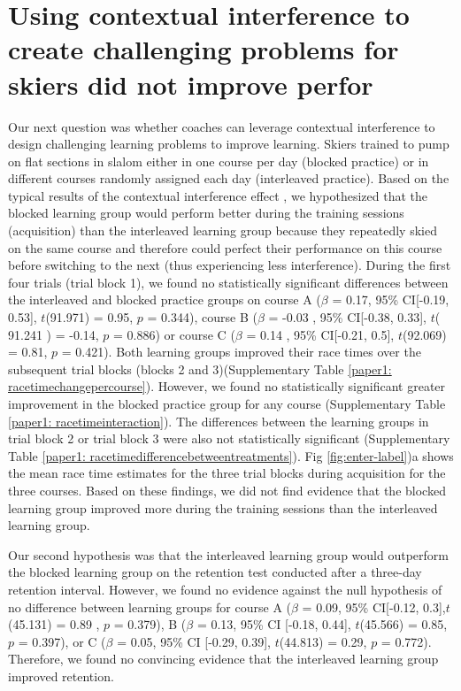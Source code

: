 \section{Using contextual interference to create challenging problems for skiers did not improve perfor}
Our next question was whether coaches can leverage contextual interference to design challenging learning problems to improve learning. Skiers trained to pump on flat sections in slalom either in one course per day (blocked practice) or in different courses randomly assigned each day (interleaved practice). Based on the typical results of the contextual interference effect \cite{simon_metacognition_2001, shea_context_1983, hall_contextual_1994, shea_contextual_1979, tsutsui_contextual_1998, thomas_using_2021}, we hypothesized that the blocked learning group would perform better during the training sessions (acquisition) than the interleaved learning group because they repeatedly skied on the same course and therefore could perfect their performance on this course before switching to the next (thus experiencing less interference). During the first four trials (trial block 1), we found no statistically significant differences between the interleaved and blocked practice groups on course A ($\beta$ = 0.17, 95\% CI[-0.19, 0.53], $t$(91.971) = 0.95, $p$ =  0.344), course B ($\beta$ = -0.03 , 95\% CI[-0.38, 0.33], $t$( 91.241 ) = -0.14, $p$ = 0.886) or course C ($\beta$ = 0.14 , 95\% CI[-0.21, 0.5], $t$(92.069) = 0.81, $p$ = 0.421). Both learning groups improved their race times over the subsequent trial blocks (blocks 2 and 3)(Supplementary Table \ref{paper1: racetimechangepercourse}). However, we found no statistically significant greater improvement in the blocked practice group for any course (Supplementary Table \ref{paper1: racetimeinteraction}). The differences between the learning groups in trial block 2 or trial block 3 were also not statistically significant (Supplementary Table \ref{paper1: racetimedifferencebetweentreatments}). Fig \ref{fig:enter-label})a shows the mean race time estimates for the three trial blocks during acquisition for the three courses. Based on these findings, we did not find evidence that the blocked learning group improved more during the training sessions than the interleaved learning group. 

Our second hypothesis was that the interleaved learning group would outperform the blocked learning group on the retention test conducted after a three-day retention interval. However, we found no evidence against the null hypothesis of no difference between learning groups for course A ($\beta$ = 0.09, 95\% CI[-0.12, 0.3],$t$(45.131) = 0.89 , $p$ = 0.379), B ($\beta$ = 0.13, 95\% CI [-0.18, 0.44], $t$(45.566) = 0.85, $p$ = 0.397), or C ($\beta$ = 0.05, 95\% CI [-0.29, 0.39], $t$(44.813) = 0.29, $p$ = 0.772). Therefore, we found no convincing evidence that the interleaved learning group improved retention.

